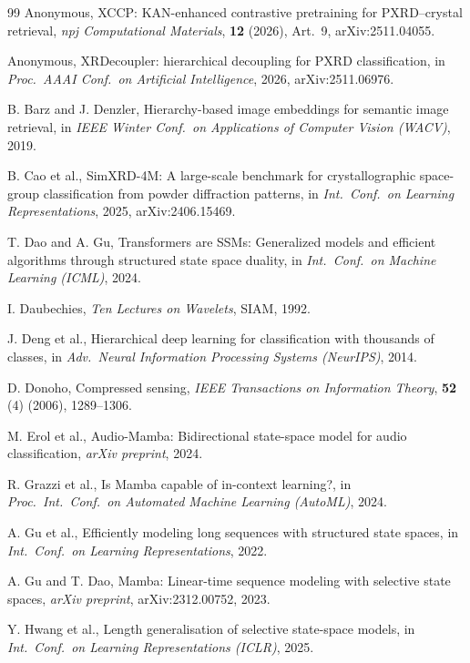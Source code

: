 \documentclass[final]{ws-ijwmip}
\begin{document}
\begin{thebibliography}{99}
Anonymous, XCCP: KAN-enhanced contrastive pretraining for PXRD--crystal
retrieval, \emph{npj Computational Materials}, \textbf{12} (2026), Art.~9,
arXiv:2511.04055.

Anonymous, XRDecoupler: hierarchical decoupling for PXRD classification,
in \emph{Proc.\ AAAI Conf.\ on Artificial Intelligence}, 2026,
arXiv:2511.06976.

B. Barz and J. Denzler, Hierarchy-based image embeddings for semantic
image retrieval, in \emph{IEEE Winter Conf.\ on Applications of Computer
Vision (WACV)}, 2019.

B. Cao et al., SimXRD-4M: A large-scale benchmark for crystallographic
space-group classification from powder diffraction patterns,
in \emph{Int.\ Conf.\ on Learning Representations}, 2025,
arXiv:2406.15469.

T. Dao and A. Gu, Transformers are SSMs: Generalized models and
efficient algorithms through structured state space duality,
in \emph{Int.\ Conf.\ on Machine Learning (ICML)}, 2024.

I. Daubechies, \emph{Ten Lectures on Wavelets}, SIAM, 1992.

J. Deng et al., Hierarchical deep learning for classification with
thousands of classes, in \emph{Adv.\ Neural Information Processing
Systems (NeurIPS)}, 2014.

D. Donoho, Compressed sensing, \emph{IEEE Transactions on Information
Theory}, \textbf{52}\,(4) (2006), 1289--1306.

M. Erol et al., Audio-Mamba: Bidirectional state-space model for
audio classification, \emph{arXiv preprint}, 2024.

R. Grazzi et al., Is Mamba capable of in-context learning?, in
\emph{Proc.\ Int.\ Conf.\ on Automated Machine Learning (AutoML)}, 2024.

A. Gu et al., Efficiently modeling long sequences with structured
state spaces, in \emph{Int.\ Conf.\ on Learning Representations}, 2022.

A. Gu and T. Dao, Mamba: Linear-time sequence modeling with selective
state spaces, \emph{arXiv preprint}, arXiv:2312.00752, 2023.

Y. Hwang et al., Length generalisation of selective state-space models,
in \emph{Int.\ Conf.\ on Learning Representations (ICLR)}, 2025.


\end{thebibliography}
\end{document}
